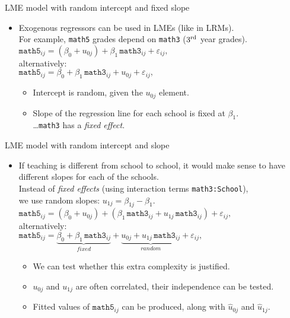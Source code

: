 \documentclass{beamer}
\begin{document}
\begin{frame}{LME model with random intercept and fixed slope}
\begin{itemize}
\item Exogenous regressors can be used in LMEs (like in LRMs).\\
\smallskip
For example, \texttt{math5} grades depend on \texttt{math3} ($3{^{\textnormal{rd}}}$ year grades).\\
\bigskip
$ \texttt{math5}_{ij} = \left( \beta_{0} + u_{0j} \right) + \beta_1 \, \texttt{math3}_{ij} + \varepsilon_{ij}, $\\
\medskip
alternatively: \\ \medskip
$ \texttt{math5}_{ij} = \beta_{0} + \beta_1 \, \texttt{math3}_{ij} + u_{0j} + \varepsilon_{ij}, $\\
\bigskip
\begin{itemize}
\item Intercept is random, given the $u_{0j}$ element.
\smallskip
\item Slope of the regression line for each school is fixed at $\beta_1$.\\
\dots \texttt{math3} has a \textit{fixed effect}.
\end{itemize}
\end{itemize}
\end{frame}
\begin{frame}{LME model with random intercept and slope}
\begin{itemize}
\item If teaching is different from school to school, it would make
sense to have different slopes for each of the schools.\\
\medskip
Instead of \textit{fixed effects} (using interaction terms \texttt{math3:School}), \\we use random slopes: $ u_{1j} = \beta_{1j} - \beta_1 $. \\
\bigskip
$ \texttt{math5}_{ij} = \left( \beta_{0} + u_{0j} \right) + \left( \beta_1\, \texttt{math3}_{ij}  + u_{1j} \, \texttt{math3}_{ij}  \right) + \varepsilon_{ij}, $ \\
\medskip
alternatively:\\
\medskip
$\texttt{math5}_{ij} = \underbrace{\beta_{0} + \beta_1 \,  \texttt{math3}_{ij}}_{\textit{fixed}}
+ \underbrace{u_{0j} + u_{1j} \, \texttt{math3}_{ij}}_{\textit{random}} 
+ \varepsilon_{ij}, $ \\
\bigskip
\begin{itemize}
\item We can test whether this extra complexity is justified.
\smallskip
\item ${u}_{0j}$ and ${u}_{1j}$ are often correlated, their independence can be tested.
\smallskip
\item Fitted values of $\texttt{math5}_{ij}$ can be produced, along with $\hat{u}_{0j}$ and $\hat{u}_{1j}$.
\end{itemize}
\end{itemize}
\end{frame}
\end{document}
